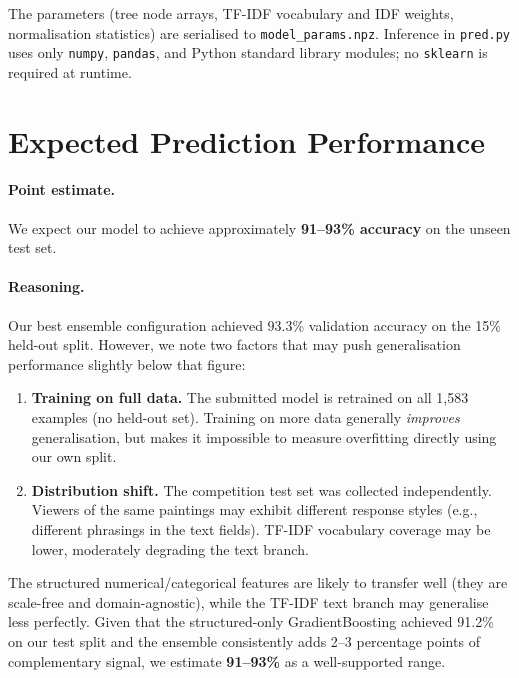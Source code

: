 \documentclass[11pt,letterpaper]{article}
\begin{document}
The parameters (tree node arrays, TF-IDF vocabulary and IDF weights, normalisation
statistics) are serialised to \texttt{model\_params.npz}. Inference in
\texttt{pred.py} uses only \texttt{numpy}, \texttt{pandas}, and Python standard
library modules; no \texttt{sklearn} is required at runtime.

\section{Expected Prediction Performance}

\paragraph{Point estimate.} We expect our model to achieve approximately
\textbf{91--93\% accuracy} on the unseen test set.

\paragraph{Reasoning.}
Our best ensemble configuration achieved 93.3\% validation accuracy on the
15\% held-out split. However, we note two factors that may push generalisation
performance slightly below that figure:

\begin{enumerate}
  \item \textbf{Training on full data.} The submitted model is retrained on all
        1{,}583 examples (no held-out set). Training on more data generally
        \emph{improves} generalisation, but makes it impossible to measure
        overfitting directly using our own split.
  \item \textbf{Distribution shift.} The competition test set was collected
        independently. Viewers of the same paintings may exhibit different response
        styles (e.g., different phrasings in the text fields). TF-IDF vocabulary
        coverage may be lower, moderately degrading the text branch.
\end{enumerate}

The structured numerical/categorical features are likely to transfer well (they are
scale-free and domain-agnostic), while the TF-IDF text branch may generalise
less perfectly. Given that the structured-only GradientBoosting achieved 91.2\%
on our test split and the ensemble consistently adds 2--3 percentage points of
complementary signal, we estimate \textbf{91--93\%} as a well-supported range.
\end{document}

